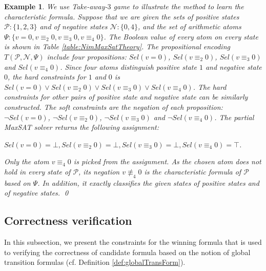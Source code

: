 \documentclass[review]{elsarticle}
\newcommand{\set}[1]{\{ #1 \}}
\newcommand{\true}{\top}
\newcommand{\false}{\bot}
\newcommand{\positiveSet}{\mathcal{P}}
\newcommand{\negativeSet}{\mathcal{N}}
\newcommand{\modulo}{\equiv}
\newcommand{\nmodulo}{\not \equiv}
\newcommand{\featureSet}{\Psi}
\newtheorem{example}{Example}
\begin{document}
    \begin{example} \label{exm:NimMaxSatTheory} \rm 
        We use Take-away-$3$ game to illustrate the method to learn the characteristic formula.
        Suppose that we are given the sets of positive states $\positiveSet: \set{1, 2, 3}$ and of negative states $\negativeSet: \set{0, 4}$, and the set of arithmetic atoms $\Psi: \set{v = 0,v \modulo_2 0,v \modulo_3 0,v \modulo_4 0}$. 
		The Boolean value of every atom on every state is shown in Table \ref{table:NimMaxSatTheory}.
		The propositional encoding $T(\positiveSet, \negativeSet, \featureSet)$ include four propositions: $Sel(v = 0)$, $Sel(v \modulo_2 0)$, $Sel(v \modulo_3 0)$ and $Sel(v \modulo_4 0)$.
		Since four atoms distinguish positive state $1$ and negative state $0$, the hard constraints for $1$ and $0$ is $Sel(v = 0) \lor Sel(v \modulo_2 0) \lor Sel(v \modulo_3 0) \lor Sel(v \modulo_4 0)$.
		The hard constraints for other pairs of positive state and negative state can be similarly constructed.
		The soft constraints are the negation of each proposition: $\neg Sel(v = 0)$, $\neg Sel(v \modulo_2 0)$, $\neg Sel(v \modulo_3 0)$ and $\neg Sel(v \modulo_4 0)$.
		The partial MaxSAT solver returns the following assignment:
		\begin{center}
			$Sel(v = 0) = \false, Sel(v \modulo_2 0) = \false, Sel(v \modulo_3 0) = \false, Sel(v \modulo_4 0) = \true$.
		\end{center}
		
		Only the atom $v \modulo_4 0$ is picked from the assignment.
		As the chosen atom does not hold in every state of $\positiveSet$, its negation $v \nmodulo_4 0$ is the characteristic formula of $\positiveSet$ based on $\Psi$.
		In addition, it exactly classifies the given states of positive states and of negative states. \qed			
     \end{example}
     
\subsection{Correctness verification} \label{sec:winFormCorVer}
    In this subsection, we present the constraints for the winning formula that is used to verifying the correctness of candidate formula based on the notion of global transition formulas (cf. Definition \ref{def:globalTransForm}).
	
\end{document}
